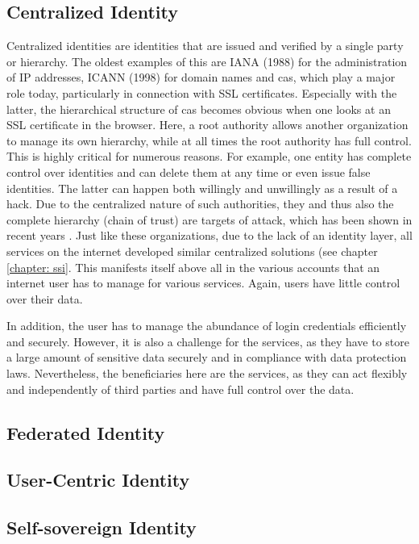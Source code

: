 	    \subsection{Centralized Identity}
	    Centralized identities are identities that are issued and verified by a single party or hierarchy. The oldest examples of this are IANA (1988) for the administration of IP addresses, ICANN (1998) for domain names and \acfp{ca}, which play a major role today, particularly in connection with SSL certificates. Especially with the latter, the hierarchical structure of \acp{ca} becomes obvious when one looks at an SSL certificate in the browser. Here, a root authority allows another organization to manage its own hierarchy, while at all times the root authority has full control. This is highly critical for numerous reasons. For example, one entity has complete control over identities and can delete them at any time or even issue false identities. The latter can happen both willingly and unwillingly as a result of a hack. Due to the centralized nature of such authorities, they and thus also the complete hierarchy (chain of trust) are targets of attack, which has been shown in recent years \cite{borchers_diginotar-ssl-gau_2012}. Just like these organizations, due to the lack of an identity layer, all services on the internet developed similar centralized solutions (see chapter \ref{chapter: ssi}. This manifests itself above all in the various accounts that an internet user has to manage for various services. Again, users have little control over their data. \cite{allen_path_2016}
	    
	    In addition, the user has to manage the abundance of login credentials efficiently and securely. However, it is also a challenge for the services, as they have to store a large amount of sensitive data securely and in compliance with data protection laws. Nevertheless, the beneficiaries here are the services, as they can act flexibly and independently of third parties and have full control over the data. \cite[p. 6]{ehrlich_self-sovereign_2021}
	    
	    
	    \subsection{Federated Identity}
	    \subsection{User-Centric Identity}
	    \subsection{Self-sovereign Identity}
	
